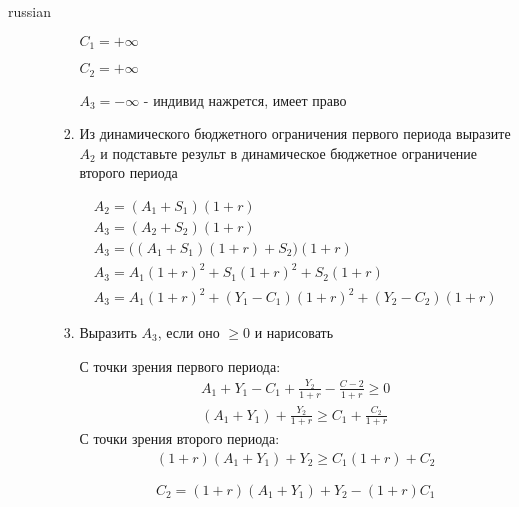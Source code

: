 \documentclass{article}
\begin{document}
\begin{otherlanguage*}{russian}
\begin{enumerate}
\begin{enumerate}
\begin{enumerate}
$ C_1 = + \infty $ 

$ C_2 = + \infty $ 

$ A_3 = - \infty $ - индивид нажрется, имеет право
 
\item Из динамического бюджетного ограничения первого периода выразите $ A_2 $ и подставьте результ в динамическое бюджетное ограничение второго периода 

\begin{align}
A_2 = (A_1 + S_1) (1 +r) \\
A_3 = (A_2 + S_2) (1 + r) \\
A_3 = \Big( (A_1 + S_1) (1 + r) + S_2 \Big) (1 + r) \\
A_3 = A_1 (1 + r)^2 + S_1 (1 + r)^ 2 + S_2 ( 1+ r) \\
A_3 = A_1 (1 + r)^2 + (Y_1 - C_1) (1 + r)^ 2 + (Y_2 - C_2) ( 1+ r) 
\end{align}

\item Выразить $A_3$, если оно $ \ge 0 $ и нарисовать 

С точки зрения первого периода:
\begin{align}
A_1 + Y_1 - C_1 + \frac{Y_2}{1 + r} - \frac{C-2}{1 +r } \ge 0 \\
(A_1 + Y_1) + \frac{Y_2}{1 + r} \ge C_1 + \frac{C_2}{1 + r} 
\end{align}
С точки зрения второго периода:
\begin{align}
(1 + r)(A_1 + Y_1) + Y_2 \ge C_1 ( 1 + r) + C_2 
\end{align}


\begin{equation}
C_2 = (1 + r) (A_1 + Y_1) + Y_2 - (1 + r) C_1
\end{equation}



\end{enumerate}
\end{enumerate}
\end{enumerate}
\end{otherlanguage*}
\end{document}
